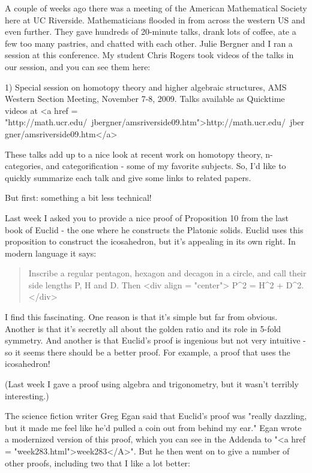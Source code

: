 


A couple of weeks ago there was a meeting of the American Mathematical
Society here at UC Riverside.  Mathematicians flooded in from across
the western US and even further.  They gave hundreds of 20-minute
talks, drank lots of coffee, ate a few too many pastries, and chatted
with each other.  Julie Bergner and I ran a session at this
conference.  My student Chris Rogers took videos of the talks in our
session, and you can see them here:

1) Special session on homotopy theory and higher algebraic structures,
AMS Western Section Meeting, November 7-8, 2009.  Talks available as
Quicktime videos at <a href =
"http://math.ucr.edu/~jbergner/amsriverside09.htm">http://math.ucr.edu/~jbergner/amsriverside09.htm</a>

These talks add up to a nice look at recent work on homotopy theory,
n-categories, and categorification - some of my favorite subjects.
So, I'd like to quickly summarize each talk and give some links to
related papers.

But first: something a bit less technical!

Last week I asked you to provide a nice proof of Proposition 10 from
the last book of Euclid - the one where he constructs the Platonic
solids.  Euclid uses this proposition to construct the icosahedron,
but it's appealing in its own right.  In modern language it says:

\begin{quote}
 Inscribe a regular pentagon, hexagon and decagon in a circle,
 and call their side lengths P, H and D.  Then 
<div align = "center">
P^{2} = H^{2} + D^{2}.
</div>
\end{quote}

I find this fascinating.  One reason is that it's simple but far from
obvious.  Another is that it's secretly all about the golden ratio and
its role in 5-fold symmetry.  And another is that Euclid's proof is
ingenious but not very intuitive - so it seems there should be a
better proof.  For example, a proof that uses the icosahedron!

(Last week I gave a proof using algebra and trigonometry, but
it wasn't terribly interesting.)

The science fiction writer Greg Egan said that Euclid's proof was
"really dazzling, but it made me feel like he'd pulled a coin out
from behind my ear." Egan wrote a modernized version of this
proof, which you can see in the Addenda to "<a href =
"week283.html">week283</A>".  But he then went on to give a
number of other proofs, including two that I like a lot better:


